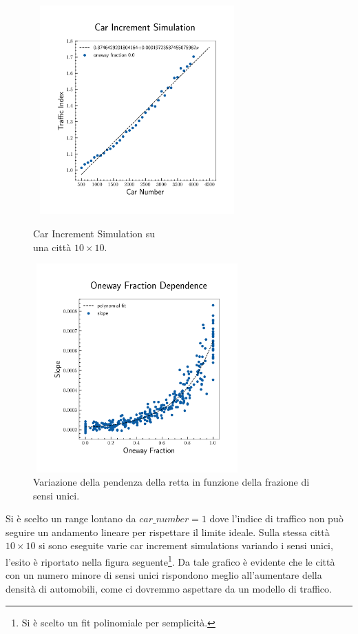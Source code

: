 \documentclass{article}
\begin{document}
        \begin{figure}[H]
            \begin{minipage}{.5\textwidth}
                \centering
                \includegraphics[width=8cm, height=8cm]{car_increment.png}
                \caption{Car Increment Simulation su\\ una città $10 \times 10$.}
                \label{fig:9}
            \end{minipage}
            \begin{minipage}{.5\textwidth}
                \centering
                \includegraphics[width=8cm, height=8cm]{oneway_fraction_dependence.png}
                \caption{Variazione della pendenza della retta in funzione della frazione di sensi unici.}
                \label{fig:8}
            \end{minipage}
        \end{figure}

        Si è scelto un range lontano da $car\_number = 1$ dove l'indice di traffico non può seguire un andamento lineare per rispettare il limite ideale.
        Sulla stessa città $10 \times 10$ si sono eseguite varie car increment simulations variando i sensi unici, l'esito è riportato nella figura seguente\footnote{Si è scelto un fit polinomiale per semplicità.}.
        Da tale grafico è evidente che le città con un numero minore di sensi unici rispondono meglio all'aumentare della densità di automobili, come ci dovremmo
        aspettare da un modello di traffico.
\end{document}
